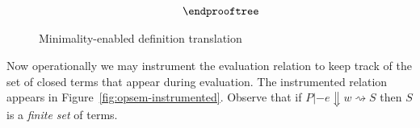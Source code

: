 \documentclass[preprint,nocopyrightspace,draft]{sigplanconf}
\begin{document}
\begin{figure}
\[\begin{array}{c}
{\begin{array}{l}
{\begin{array}{l}
\begin{array}{ll}
                   \end{array}
     \end{array}}
  \end{array}}
\endprooftree
\end{array}\]
\caption{Minimality-enabled definition translation}\label{fig:min-def-trans}
\end{figure}


\newcommand{\curly}{\rightsquigarrow}
Now operationally we may instrument the evaluation relation to keep track of the set of 
closed terms that appear during evaluation. The instrumented relation appears in 
Figure~\ref{fig:opsem-instrumented}. Observe that if $P |- e \Downarrow w \curly S$ then 
$S$ is a {\em finite set} of terms.
\end{document}
